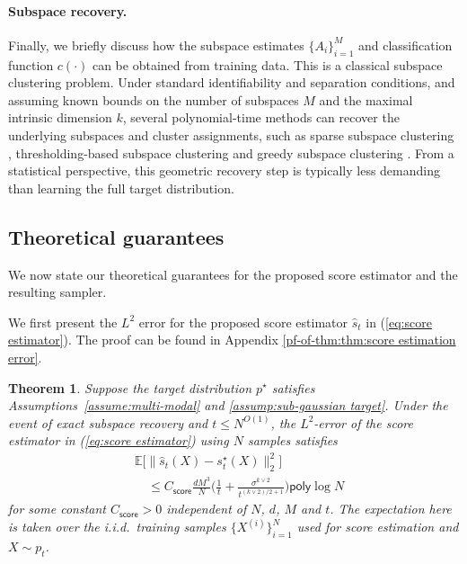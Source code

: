 \documentclass{article}
\newcommand{\wh}{\widehat}
\newcommand{\score}{\mathsf{score}}
\newcommand{\polylog}{\mathsf{poly}\log}
\theoremstyle{plain}
\newtheorem{theorem}{\bf Theorem}
\theoremstyle{remark}
\begin{document}
\paragraph{Subspace recovery.}
Finally, we briefly discuss how the subspace estimates $\{A_i\}_{i=1}^M$ and classification function $c(\cdot)$ can be obtained from training data.
This is a classical subspace clustering problem. Under standard identifiability and separation conditions, and assuming known bounds on the number of subspaces $M$ and the maximal intrinsic dimension $k$, several polynomial-time methods can recover the underlying subspaces and cluster assignments, such as sparse subspace clustering \cite{elhamifar2013sparsesubspaceclusteringalgorithm}, thresholding-based subspace clustering \cite{heckel2015robustsubspaceclusteringthresholding} and greedy subspace clustering \cite{park2014greedysubspaceclustering}.
From a statistical perspective, this geometric recovery step is typically less demanding than learning the full target distribution.


\subsection{Theoretical guarantees}

We now state our theoretical guarantees for the proposed score estimator and the resulting sampler.

We first present the $L^2$ error for the proposed score estimator $\wh s_t$ in (\ref{eq:score estimator}).
The proof can be found in Appendix \ref{pf-of-thm:thm:score estimation error}.
\begin{theorem}
    \label{thm:score estimation error}
    Suppose the target distribution $p^\star$ satisfies Assumptions~\ref{assume:multi-modal} and \ref{assump:sub-gaussian target}.
    Under the event of exact subspace recovery and $t\leq N^{O(1)}$, the $L^2$-error of the score estimator in (\ref{eq:score estimator}) using $N$ samples satisfies
    \begin{align*}
        &\mathbb{E}\big[\|\widehat{s}_t(X)-s_t^\star(X)\|_2^2\big] \\
        & \quad \leq  C_\score \frac{dM^3}{N} \Big( \frac{1}{t}+\frac{\sigma^{k\vee2}}{t^{{(k\vee2)}/2+1}}\Big)  \polylog N 
    \end{align*}
    for some constant $C_\score >0$ independent of $N$, $d$, $M$ and $t$.
    The expectation here is taken over the i.i.d.\ training samples $\{ X^{(i)}\}_{i=1}^N$ used for score estimation and $X \sim p_t$.
\end{theorem}
\end{document}
